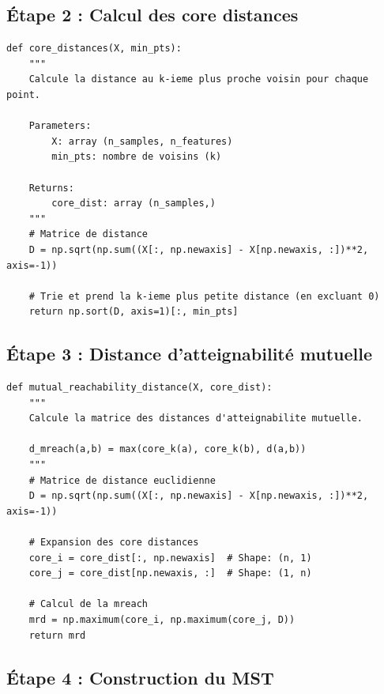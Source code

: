 \documentclass[11pt,a4paper]{article}
\begin{document}
\subsection{Étape 2 : Calcul des core distances}

\begin{lstlisting}[caption=Calcul des core distances]
def core_distances(X, min_pts):
    """
    Calcule la distance au k-ieme plus proche voisin pour chaque point.
    
    Parameters:
        X: array (n_samples, n_features)
        min_pts: nombre de voisins (k)
    
    Returns:
        core_dist: array (n_samples,)
    """
    # Matrice de distance
    D = np.sqrt(np.sum((X[:, np.newaxis] - X[np.newaxis, :])**2, axis=-1))
    
    # Trie et prend la k-ieme plus petite distance (en excluant 0)
    return np.sort(D, axis=1)[:, min_pts]
\end{lstlisting}

\subsection{Étape 3 : Distance d'atteignabilité mutuelle}

\begin{lstlisting}[caption=Calcul de la distance d'atteignabilité mutuelle]
def mutual_reachability_distance(X, core_dist):
    """
    Calcule la matrice des distances d'atteignabilite mutuelle.
    
    d_mreach(a,b) = max(core_k(a), core_k(b), d(a,b))
    """
    # Matrice de distance euclidienne
    D = np.sqrt(np.sum((X[:, np.newaxis] - X[np.newaxis, :])**2, axis=-1))
    
    # Expansion des core distances
    core_i = core_dist[:, np.newaxis]  # Shape: (n, 1)
    core_j = core_dist[np.newaxis, :]  # Shape: (1, n)
    
    # Calcul de la mreach
    mrd = np.maximum(core_i, np.maximum(core_j, D))
    return mrd
\end{lstlisting}

\subsection{Étape 4 : Construction du MST}
\end{document}
